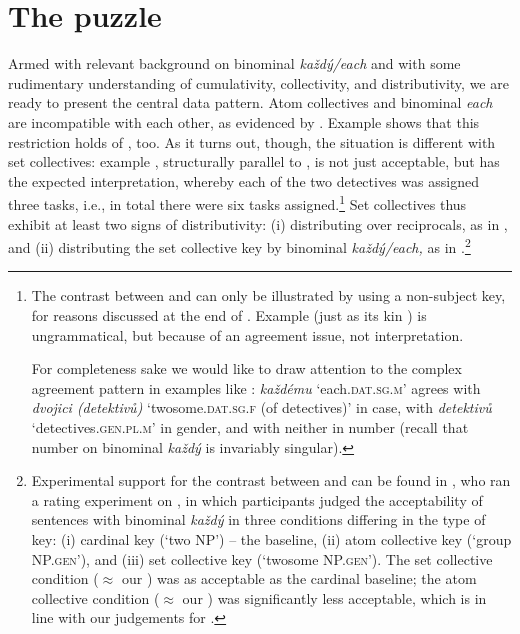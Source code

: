 \documentclass[output=paper,colorlinks,citecolor=brown,newtxmath]{langscibook}
\begin{document}

\section{The puzzle}\label{s:puzzle}

\largerpage
Armed with relevant background on binominal \textit{každý/each} and with some rudimentary understanding of cumulativity, collectivity, and distributivity, we are ready to present the central data pattern. Atom collectives and binominal \textit{each} are incompatible with each other, as evidenced by . Example  shows that this restriction holds of , too. As it turns out, though, the situation is different with set collectives: example , structurally parallel to , is not just acceptable, but has the expected interpretation, whereby each of the two detectives was assigned three tasks, i.e., in total there were six tasks assigned.\footnote{The contrast between  and  can only be illustrated by using a non-subject key, for reasons discussed at the end of . Example  (just as its kin ) is ungrammatical, but because of an agreement issue, not interpretation.

\label{ex:coll.num.subj}
\z

\noindent For completeness sake we would like to draw attention to the complex agreement pattern in examples like : \textit{každému} `each.\textsc{dat.sg.m}' agrees with \textit{dvojici (detektivů)} `twosome.\textsc{dat.sg.f} (of detectives)' in case, with \textit{detektivů} `detectives.\textsc{gen.pl.m}' in gender, and with neither in number (recall that number on binominal \textit{každý} is invariably singular).} Set collectives thus exhibit at least two signs of distributivity: (i) distributing over reciprocals, as in , and (ii) distributing the set collective key by binominal \textit{každý/each,} as in .\footnote{Experimental support for the contrast between  and  can be found in \citet{Kuruncziova2020thesis}, who ran a rating experiment on , in which participants judged the acceptability of sentences with binominal \textit{každý} in three conditions differing in the type of key: (i) cardinal key (`two NP') -- the baseline, (ii) atom collective key (`group NP.\textsc{gen}'), and (iii) set collective key (`twosome NP.\textsc{gen}'). The set collective condition ($\approx$ our ) was as acceptable as the cardinal baseline; the atom collective condition ($\approx$ our ) was significantly less acceptable, which is in line with our judgements for .}
\end{document}
